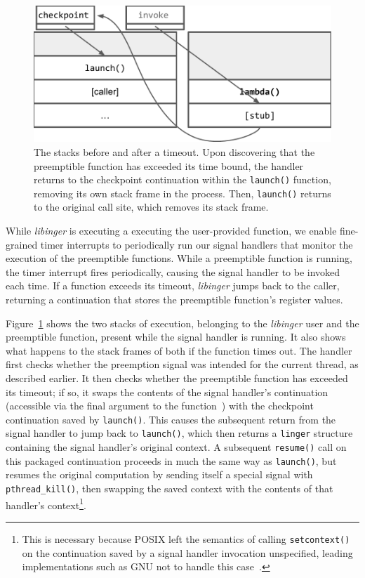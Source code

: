 \begin{figure}
\includegraphics[width=\columnwidth]{figs/twostacks}
\caption{The stacks before and after a timeout.  \textnormal{Upon discovering
that the preemptible function has exceeded its time bound, the handler returns to the
checkpoint continuation within the \texttt{launch()} function, removing its own stack
frame in the process.  Then, \texttt{launch()} returns to the original call site,
which removes its stack frame.}}
\label{fig:twostacks}
\end{figure}

While \textit{libinger} is executing a executing the user-provided function, we
enable fine-grained timer interrupts to periodically run our signal handlers
that monitor the execution of the preemptible functions. While a preemptible
function is running, the timer interrupt fires periodically, causing the signal
handler to be invoked each time. If a function exceeds its timeout, \textit{libinger}
jumps back to the caller, returning a continuation that stores the preemptible
function's register values.

Figure~\ref{fig:twostacks} shows the two stacks of execution, belonging to the
\textit{libinger} user and the preemptible function, present while the signal handler
is running. It also shows what happens to the stack frames of both if the
function times out. The handler first checks whether the preemption signal was
intended for the current thread, as described earlier.  It then checks whether
the preemptible function has exceeded its timeout; if so, it swaps the contents
of the signal handler's continuation (accessible via the final argument to the
function~\cite{sigaction-manpage}) with the checkpoint continuation saved by
\texttt{launch()}.  This causes the subsequent return from the signal handler
to jump back to \texttt{launch()}, which then returns a \texttt{linger}
structure containing the signal handler's original context.  A subsequent
\texttt{resume()} call on this packaged continuation proceeds in much the same
way as \texttt{launch()}, but resumes the original computation by sending
itself a special signal with \texttt{pthread\_kill()}, then swapping the saved
context with the contents of that handler's context\footnote{This is necessary
because POSIX left the semantics of calling \texttt{setcontext()} on the
continuation saved by a signal handler invocation unspecified, leading
implementations such as GNU not to handle this
case~\cite{getcontext-manpage}.}.


